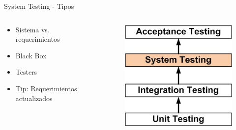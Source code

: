 \documentclass[aspectratio=169]{beamer}
\begin{document}
\begin{frame}{System Testing - Tipos}
\begin{columns}[T]
	\begin{column}[T]{6cm}
		\begin{itemize}
			\item Sistema vs. requerimientos
			\item Black Box
			\item Testers
			\item Tip: Requerimientos actualizados
		\end{itemize}
	\end{column}
	\begin{column}[T]{4cm} %
		\begin{figure}
			\centering
			\includegraphics[width=0.8\linewidth]{Images/systemtesting}
		\end{figure}
	\end{column}
\end{columns}
\end{frame}
\end{document}
